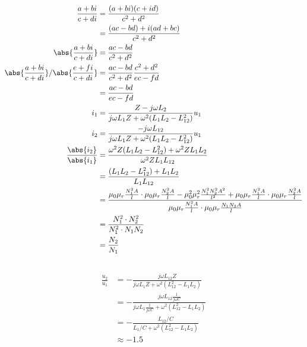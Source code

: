 \documentclass[11pt]{article}
\begin{document}
\subsection{}
\begin{align*}\frac{a + bi}{c+ di} &= \frac{(a + bi)(c+id)}{c^2+ d^2}\\
    &= \frac{(ac - bd) + i(ad + bc)}{c^2+ d^2}\\
    \abs{\frac{a + bi}{c+ di}}&= \frac{ac - bd}{c^2+ d^2}\\
    \abs{\frac{a + bi}{c+ di}} /\abs{\frac{e + fi}{c+ di}}&= \frac{ac - bd}{c^2+ d^2} \frac{c^2+ d^2}{ec - fd}\\
    &= \frac{ac - bd}{ec - fd}\\
    i_1 &= \frac{Z - j \omega L_2}{j \omega L_1 Z + \omega^2 (L_1 L_2 - L_{12}^2)} u_1\\
    i_2 &= \frac{-j\omega L_{12}}{j \omega L_1 Z + \omega^2 (L_1 L_2 - L_{12}^2)} u_1\\
    \frac{\abs{i_2}}{\abs{i_1}} &=  \frac{\omega^2 Z (L_1 L_2 - L_{12}^2) + \omega^2 Z L_1 L_2}
    {\omega ^2 Z L_1 L_{12}}\\
    &=  \frac{(L_1 L_2 - L_{12}^2) +  L_1 L_2}
    {L_1 L_{12}}\\
    &= \frac{{\mu_0 \mu_{r} \frac{N_1^2 A }{l} \cdot \mu_0 \mu_{r} \frac{N_2^2 A }{l}} 
    - \mu_0^2 \mu_{r}^2 \frac{N_1^2 N_2^2 A^2 }{l^2} +  
    \mu_0 \mu_{r} \frac{N_1^2 A }{l} \cdot \mu_0 \mu_{r} \frac{N_2^2 A }{l}}
    {\mu_0 \mu_{r} \frac{N_1^2 A }{l}\cdot  \mu_0 \mu_{r} \frac{N_1 N_2 A }{l}}\\
    &= \frac{N_1^2 \cdot N_2^2}
    {N_1^2\cdot N_1 N_2}\\
    &= \frac{N_2}{N_1}\\ 
\end{align*}

\subsection{}
\begin{align*}
    \frac{u_2}{u_1} &= -\frac{j\omega L_{12} Z}{j\omega L_1 Z + \omega^2 (L_{12}^2-L_1 L_2)}\\
    &= -\frac{j\omega L_{12} \frac{1}{j \omega C}}{j\omega L_1 \frac{1}{j \omega C} + \omega^2 (L_{12}^2-L_1 L_2)}\\
    &= -\frac{L_{12}/C}{L_1 /C + \omega^2 (L_{12}^2-L_1 L_2)}\\
    &\approx - 1.5
\end{align*}
\end{document}

